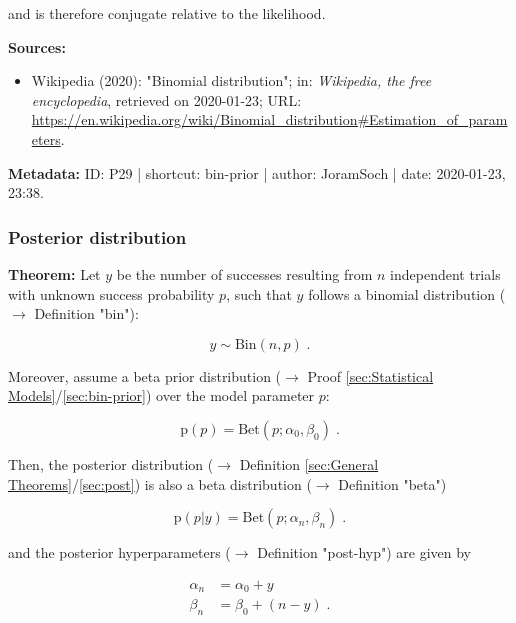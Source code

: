 \documentclass[a4paper,12pt]{book}
\begin{document}
and is therefore conjugate relative to the likelihood.

\vspace{1em}
\textbf{Sources:}
\begin{itemize}
\item Wikipedia (2020): "Binomial distribution"; in: \textit{Wikipedia, the free encyclopedia}, retrieved on 2020-01-23; URL: \url{https://en.wikipedia.org/wiki/Binomial_distribution#Estimation_of_parameters}.
\end{itemize}


\vspace{1em}
\textbf{Metadata:} ID: P29 | shortcut: bin-prior | author: JoramSoch | date: 2020-01-23, 23:38.


\subsubsection[\textbf{Posterior distribution}]{Posterior distribution} \label{sec:bin-post}

\vspace{1em}
\textbf{Theorem:} Let $y$ be the number of successes resulting from $n$ independent trials with unknown success probability $p$, such that $y$ follows a binomial distribution ($\rightarrow$ Definition "bin"):

\begin{equation} \label{eq:bin-post-Bin}
y \sim \mathrm{Bin}(n,p) \; .
\end{equation}

Moreover, assume a beta prior distribution ($\rightarrow$ Proof \ref{sec:Statistical Models}/\ref{sec:bin-prior}) over the model parameter $p$:

\begin{equation} \label{eq:bin-post-Bin-prior}
\mathrm{p}(p) = \mathrm{Bet}(p; \alpha_0, \beta_0) \; .
\end{equation}

Then, the posterior distribution ($\rightarrow$ Definition \ref{sec:General Theorems}/\ref{sec:post}) is also a beta distribution ($\rightarrow$ Definition "beta")

\begin{equation} \label{eq:bin-post-Bin-post}
\mathrm{p}(p|y) = \mathrm{Bet}(p; \alpha_n, \beta_n) \; .
\end{equation}

and the posterior hyperparameters ($\rightarrow$ Definition "post-hyp") are given by

\begin{equation} \label{eq:bin-post-Bin-post-par}
\begin{split}
\alpha_n &= \alpha_0 + y \\
\beta_n &= \beta_0 + (n-y) \; .
\end{split}
\end{equation}
\end{document}
